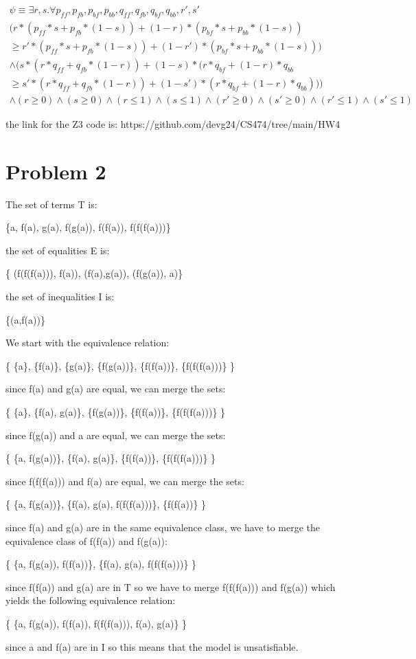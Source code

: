 \documentclass[12pt]{article}
\begin{document}
\begin {equation}
\begin{split}
    \psi \equiv \exists r,s . \forall p_{ff}, p_{fb}, p_{bf}, p_{bb}, q_{ff}, q_{fb}, q_{bf}, q_{bb}, r', s' \\ 
    (r*(p_{ff}*s + p_{fb}*(1-s)) + (1-r)*(p_{bf}*s + p_{bb}*(1-s)) \\ \geq r'*(p_{ff}*s + p_{fb}*(1-s)) + (1-r')*(p_{bf}*s + p_{bb}*(1-s))) \\ 
    \land (s*(r*q_{ff} + q_{fb} * (1-r)) + (1-s)*(r*q_{bf} + (1-r)*q_{bb} \\ \geq s'*(r*q_{ff} + q_{fb} * (1-r)) + (1-s')*(r*q_{bf} + (1-r)*q_{bb})))\\ \land (r \geq 0) \land (s \geq 0) \land (r \leq 1) \land (s \leq 1) \land (r' \geq 0) \land (s' \geq 0) \land (r' \leq 1) \land (s' \leq 1)
\end{split}
\end {equation}

the link for the Z3 code is: https://github.com/devg24/CS474/tree/main/HW4


\section*{Problem 2}

The set of terms T is:

\{a, f(a), g(a), f(g(a)), f(f(a)), f(f(f(a)))\}

the set of equalities E is:

\{ (f(f(f(a))), f(a)), (f(a),g(a)), (f(g(a)), a)\}

the set of inequalities I is:

\{(a,f(a))\}

We start with the equivalence relation:

\{ \{a\}, \{f(a)\}, \{g(a)\}, \{f(g(a))\}, \{f(f(a))\}, \{f(f(f(a)))\} \}

since f(a) and g(a) are equal, we can merge the sets:

\{ \{a\}, \{f(a), g(a)\}, \{f(g(a))\}, \{f(f(a))\}, \{f(f(f(a)))\} \}

since f(g(a)) and a are equal, we can merge the sets:

\{ \{a, f(g(a))\}, \{f(a), g(a)\}, \{f(f(a))\}, \{f(f(f(a)))\} \}

since f(f(f(a))) and f(a) are equal, we can merge the sets:

\{ \{a, f(g(a))\}, \{f(a), g(a), f(f(f(a)))\}, \{f(f(a))\} \}

since f(a) and g(a) are in the same equivalence class, we have to merge the equivalence class of f(f(a)) and f(g(a)):

\{ \{a, f(g(a)), f(f(a))\}, \{f(a), g(a), f(f(f(a)))\} \}

since f(f(a)) and g(a) are in T so we have to merge f(f(f(a))) and f(g(a)) which yields the following equivalence relation:

\{ \{a, f(g(a)), f(f(a)), f(f(f(a))), f(a), g(a)\} \}

since a and f(a)  are in I so this means that the model is unsatisfiable.
\end{document}
